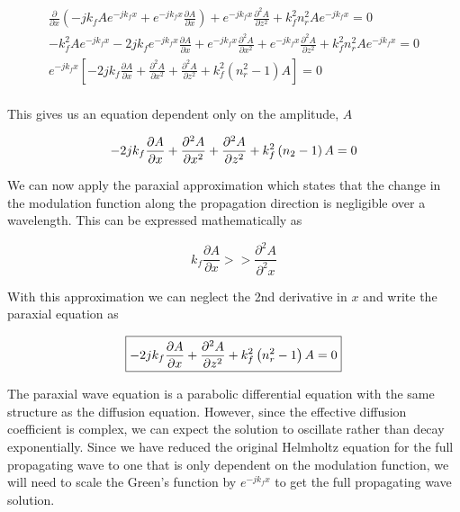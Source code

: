  \begin{equation}
 \begin{gathered}
\frac{\partial }{\partial x}\left(-jk_fAe^{-jk_fx}+e^{-jk_fx}\frac{\partial A}{\partial x} \right) + e^{-jk_fx}\frac{\partial^2 A}{\partial z^2} + k_f^2n_r^2 Ae^{-jk_fx} = 0 \\
-k_f^2Ae^{-jk_fx} -2jk_fe^{-jk_fx}\frac{\partial A}{\partial x}+e^{-jk_fx}\frac{\partial^2 A}{\partial x^2} + e^{-jk_fx}\frac{\partial^2 A}{\partial z^2} + k_f^2n_r^2 Ae^{-jk_fx} = 0 \\
e^{-jk_fx}\left[ -2jk_f\frac{\partial A}{\partial x}+\frac{\partial^2 A}{\partial x^2} + \frac{\partial^2 A}{\partial z^2} + k_f^2\left(n_r^2-1\right)A\right] = 0 \\
\end{gathered}
\label{gf_eq:41a}
\end{equation}
\renewcommand{\baselinestretch}{2} \small\normalsize
 
\noindent This gives us an equation dependent only on the amplitude, $A$

 \begin{equation}
-2jk_f\frac{\partial A}{\partial x}+\frac{\partial^2 A}{\partial x^2} + \frac{\partial^2 A}{\partial z^2} + k_f^2\left(n_2-1\right)A= 0 \\
\label{gf_eq:42}
\end{equation}
 \renewcommand{\baselinestretch}{2} \small\normalsize
 
 We can now apply the paraxial approximation which states that the change in the modulation function along the propagation direction is negligible over a wavelength. This can be expressed mathematically as
 
  \begin{equation}
k_f\frac{\partial A}{\partial x} >> \frac{\partial^2 A}{\partial^2 x}
\label{gf_eq:43}
\end{equation}
 \renewcommand{\baselinestretch}{2} \small\normalsize
 
 With this approximation we can neglect the 2nd derivative in $x$ and write the paraxial equation as
 
\begin{equation}
\boxed{-2jk_f\frac{\partial A}{\partial x} + \frac{\partial^2 A}{\partial z^2} +k_f^2\left(n_r^2-1\right)A= 0} \\
\label{gf_eq:44}
\end{equation}
\renewcommand{\baselinestretch}{2} \small\normalsize
 
The paraxial wave equation is a parabolic differential equation with the same structure as the diffusion equation. However, since the effective diffusion coefficient is complex, we can expect the solution to oscillate rather than decay exponentially. Since we have reduced the original Helmholtz equation for the full propagating wave to one that is only dependent on the modulation function, we will need to scale the Green's function by $e^{-jk_fx}$ to get the full propagating wave solution.
 
